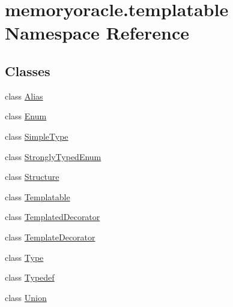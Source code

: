 \hypertarget{namespacememoryoracle_1_1templatable}{}\section{memoryoracle.\+templatable Namespace Reference}
\label{namespacememoryoracle_1_1templatable}
\subsection*{Classes}
\begin{DoxyCompactItemize}
\item 
class \hyperlink{classmemoryoracle_1_1templatable_1_1Alias}{Alias}
\item 
class \hyperlink{classmemoryoracle_1_1templatable_1_1Enum}{Enum}
\item 
class \hyperlink{classmemoryoracle_1_1templatable_1_1SimpleType}{Simple\+Type}
\item 
class \hyperlink{classmemoryoracle_1_1templatable_1_1StronglyTypedEnum}{Strongly\+Typed\+Enum}
\item 
class \hyperlink{classmemoryoracle_1_1templatable_1_1Structure}{Structure}
\item 
class \hyperlink{classmemoryoracle_1_1templatable_1_1Templatable}{Templatable}
\item 
class \hyperlink{classmemoryoracle_1_1templatable_1_1TemplatedDecorator}{Templated\+Decorator}
\item 
class \hyperlink{classmemoryoracle_1_1templatable_1_1TemplateDecorator}{Template\+Decorator}
\item 
class \hyperlink{classmemoryoracle_1_1templatable_1_1Type}{Type}
\item 
class \hyperlink{classmemoryoracle_1_1templatable_1_1Typedef}{Typedef}
\item 
class \hyperlink{classmemoryoracle_1_1templatable_1_1Union}{Union}
\end{DoxyCompactItemize}
